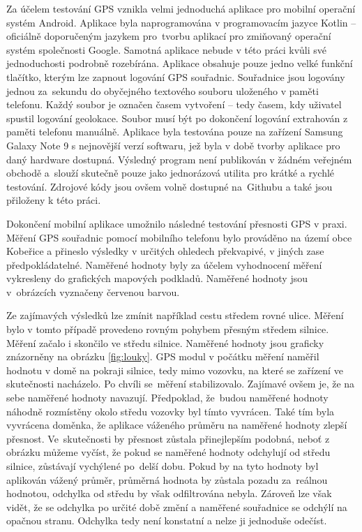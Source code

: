 \documentclass[czech, bachelor]{diploma}
\begin{document}
Za účelem testování GPS vznikla velmi jednoduchá aplikace pro mobilní operační systém Android. Aplikace byla naprogramována
v programovacím jazyce Kotlin -- oficiálně doporučeným jazykem pro~tvorbu aplikací pro zmiňovaný operační systém společnosti
Google\cite{kotlin-android-source}. Samotná aplikace nebude v této práci kvůli své jednoduchosti podrobně rozebírána. Aplikace
obsahuje pouze jedno velké funkční tlačítko, kterým lze zapnout logování GPS souřadnic. Souřadnice jsou logovány jednou za~sekundu
do obyčejného textového souboru uloženého v paměti telefonu. Každý soubor je označen časem vytvoření -- tedy časem, kdy uživatel
spustil logování geolokace. Soubor musí být po dokončení logování extrahován z paměti telefonu manuálně. Aplikace byla testována
pouze na zařízení Samsung Galaxy Note 9 s nejnovější verzí softwaru, jež byla v době tvorby aplikace pro daný hardware dostupná.
Výsledný program není publikován v žádném veřejném obchodě a~slouží skutečně pouze jako jednorázová utilita pro krátké a rychlé
testování. Zdrojové kódy jsou ovšem volně dostupné na~Githubu\cite{geologger-source} a také jsou přiloženy k této práci.

Dokončení mobilní aplikace umožnilo následné testování přesnosti GPS v praxi. Měření GPS souřadnic pomocí mobilního telefonu bylo
prováděno na území obce Kobeřice a přineslo výsledky v určitých ohledech překvapivé, v jiných zase předpokládatelné. Naměřené
hodnoty byly za účelem vyhodnocení měření vykresleny do grafických mapových podkladů. Naměřené hodnoty jsou v~obrázcích vyznačeny
červenou barvou.

Ze zajímavých výsledků lze zmínit například cestu středem rovné ulice. Měření bylo v tomto případě provedeno rovným pohybem
přesným středem silnice. Měření začalo i skončilo ve středu silnice. Naměřené hodnoty jsou graficky znázorněny na obrázku
\ref{fig:louky}. GPS modul v počátku měření naměřil hodnotu v domě na pokraji silnice, tedy mimo vozovku, na které se zařízení
ve skutečnosti nacházelo. Po chvíli se~měření stabilizovalo. Zajímavé ovšem je, že na sebe naměřené hodnoty navazují. Předpoklad,
že~budou naměřené hodnoty náhodně rozmístěny okolo středu vozovky byl tímto vyvrácen. Také tím byla vyvrácena doměnka, že aplikace
váženého průměru na naměřené hodnoty zlepší přesnost. Ve~skutečnosti by přesnost zůstala přinejlepším podobná, neboť z obrázku
můžeme vyčíst, že pokud se naměřené hodnoty odchylují od středu silnice, zůstávají vychýlené po~delší dobu. Pokud by na tyto
hodnoty byl aplikován vážený průměr, průměrná hodnota by zůstala pozadu za~reálnou hodnotou, odchylka od středu by však
odfiltrována nebyla. Zároveň lze však vidět, že se odchylka po určité době změní a naměřené souřadnice se odchýlí na opačnou
stranu. Odchylka tedy není konstatní a nelze ji jednoduše odečíst.
\end{document}
